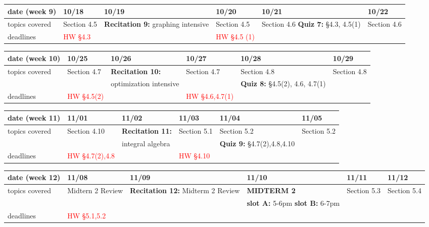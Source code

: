 \documentclass[11pt,fleqn]{article}
\begin{document}
\vfill
\begin{tabularx}{\textwidth}{|X|| X | X | X | X | X |}
\hline
\rowcolor{gray!20}
date (week 9)&10/18&10/19&10/20&10/21&10/22\\ \hline
topics covered&Section 4.5&\textbf{Recitation 9:} graphing intensive&Section 4.5&Section 4.6 \textbf{Quiz 7:} \S 4.3, 4.5(1) &Section 4.6\\  \hline
deadlines&\textcolor{red}{HW \S 4.3}&&\textcolor{red}{HW \S 4.5 (1)}&& \\  \hline
\end{tabularx}
\vfill
\begin{tabularx}{\textwidth}{|X|| X | X | X | X | X |}
\hline
\rowcolor{gray!20}
date (week 10)&10/25&10/26&10/27&10/28&10/29\\ \hline
topics covered&Section 4.7&\textbf{Recitation 10:}&Section 4.7&Section 4.8&Section 4.8\\ 
&&optimization intensive&&\textbf{Quiz 8:} \: \quad \S 4.5(2), 4.6, 4.7(1)&\\ \hline
deadlines&\textcolor{red}{HW \S 4.5(2)}&&\textcolor{red}{HW \S 4.6,4.7(1)}&& \\ \hline 
\end{tabularx}
\vfill
\begin{tabularx}{\textwidth}{|X|| X | X | X | X | X |}
\hline
\rowcolor{gray!20}
date (week 11)&11/01&11/02&11/03&11/04&11/05\\ \hline
topics covered&Section 4.10&\textbf{Recitation 11:}&Section 5.1&Section 5.2&Section 5.2\\ 
&&integral algebra&&\textbf{Quiz 9:} \S4.7(2),4.8,4.10&\\ \hline
deadlines&\textcolor{red}{HW \S 4.7(2),4.8}&&\textcolor{red}{HW \S 4.10}&& \\ \hline 
\end{tabularx}
\vfill
\begin{tabularx}{\textwidth}{|X|| X | X | X | X | X |}
\hline
\rowcolor{gray!20}
date (week 12)&11/08&11/09&11/10&11/11&11/12\\ \hline
topics covered&Midtern 2 Review&\textbf{Recitation 12:} Midterm 2 Review&\textcolor{dcyan}{\textbf{MIDTERM 2}}&Section 5.3&Section 5.4\\ 
&&&\textcolor{ddgreen}{\textbf{slot A:} 5-6pm  \textbf{slot B:} 6-7pm}&&\\ \hline
deadlines&\textcolor{red}{HW \S 5.1,5.2}&&&& \\ \hline
\end{tabularx}
\vfill
\newpage
\end{document}
